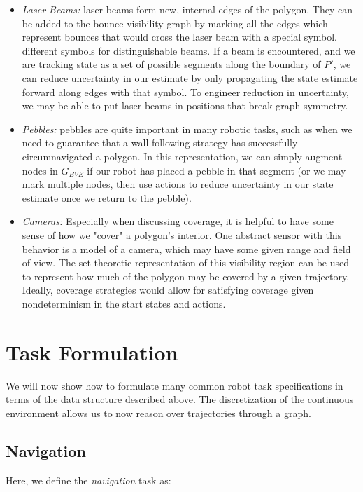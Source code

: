 \documentclass[]{styles/svproc}  %
\begin{document}
\begin{itemize}
\item \emph{Laser Beams:} laser beams form new, internal edges of the polygon. They can be
added to the bounce visibility graph by marking all the edges which represent
bounces that would cross the laser beam with a special symbol. different symbols
for distinguishable beams. If a beam is encountered, and we are tracking state
as a set of possible segments along the boundary of $P'$, we can reduce
uncertainty in our estimate by only propagating the state estimate
forward along edges with that symbol. To engineer reduction in uncertainty,
we may be able to put laser beams in positions that break graph symmetry.
\item \emph{Pebbles:} pebbles are quite important in many robotic tasks, such as
when we need to guarantee that a wall-following strategy has successfully
circumnavigated a polygon. In this representation, we can simply augment nodes
in $G_{BVE}$ if our robot has placed a pebble in that segment (or we may mark
multiple nodes, then use actions to reduce uncertainty in our state estimate
once we return to the pebble).
\item \emph{Cameras:} Especially when discussing coverage, it is helpful to have
some sense of how we "cover" a polygon's interior. One abstract sensor with this
behavior is a model of a camera, which may have some given range and field of
view. The set-theoretic representation of this visibility region can be used to
represent how much of the polygon may be covered by a given trajectory. Ideally,
coverage strategies would allow for satisfying coverage given nondeterminism in
the start states and actions.
\end{itemize}

\section{Task Formulation}

We will now show how to formulate many common robot task specifications in terms
of the data structure described above. The discretization of the continuous
environment allows us to now reason over trajectories through a graph.


\subsection{Navigation}

Here, we define the \emph{navigation} task as:
\end{document}
